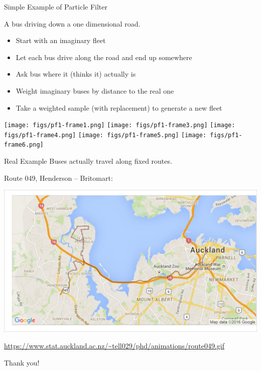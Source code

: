 \documentclass[10pt,t]{beamer}
\begin{document}
\begin{frame}{Simple Example of Particle Filter}

  A bus driving down a one dimensional road.
  \onslide<+->

  \begin{itemize}[<+- | alert@+>]
  \item Start with an imaginary fleet
  \item Let each bus drive along the road and end up somewhere
  \item Ask bus where it (thinks it) actually is
  \item Weight imaginary buses by distance to the real one
  \item Take a weighted sample (with replacement) to generate a new fleet
  \end{itemize}
  
  \begin{overprint}
    \centering
    \texttt{[image: figs/pf1-frame1.png]}
    \centering
    \texttt{[image: figs/pf1-frame3.png]}
    \centering
    \texttt{[image: figs/pf1-frame4.png]}
    \centering
    \texttt{[image: figs/pf1-frame5.png]}
    \centering
    \texttt{[image: figs/pf1-frame6.png]}
  \end{overprint}

  \onslide<+->
\end{frame}


\begin{frame}{Real Example}
  Buses actually travel along fixed routes.
  
  Route 049, Henderson -- Britomart:
  
  {\centering
  \includegraphics[width=\textwidth]{pf/particle_map001.jpg}}

  \footnotesize\url{https://www.stat.auckland.ac.nz/~tell029/phd/animations/route049.gif}

\end{frame}


\begin{frame}[standout]
  Thank you!
\end{frame}
\end{document}
